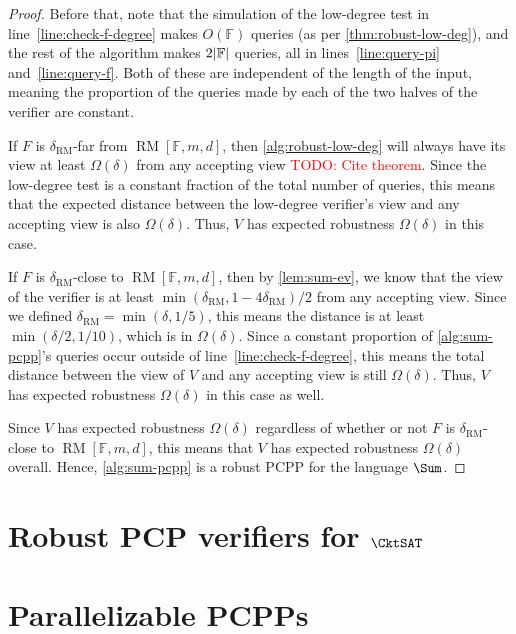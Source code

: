 \documentclass[english,12pt]{reedthesis}
\theoremstyle{plain}
\theoremstyle{definition}
\theoremstyle{remark}
\DeclareMathOperator{\RM}{RM}
\DeclarePairedDelimiter{\abs}{\lvert}{\rvert}
\newcommand{\TODO}[1]{\textcolor{red}{TODO: #1}}
\begin{document}
\begin{proof}
  Before that, note that the simulation of the low-degree test in
  line~\ref{line:check-f-degree} makes $O(\mathbb{F})$ queries (as per
  \cref{thm:robust-low-deg}), and the rest of the algorithm makes
  $2\abs{\mathbb{F}}$ queries, all in lines~\ref{line:query-pi}
  and~\ref{line:query-f}. Both of these are independent of the length of the
  input, meaning the proportion of the queries made by each of the two halves of
  the verifier are constant.

  If $F$ is $\delta_{\RM}$-far from $\RM[\mathbb{F}, m, d]$, then
  \cref{alg:robust-low-deg} will always have its view at least $\Omega(\delta)$ from any
  accepting view \TODO{Cite theorem}. Since the low-degree test is a constant
  fraction of the total number of queries, this means that the expected distance
  between the low-degree verifier's view and any accepting view is also $\Omega(\delta)$.
  Thus, $V$ has expected robustness $\Omega(\delta)$ in this case.

  If $F$ is $\delta_{\RM}$-close to $\RM[\mathbb{F}, m, d]$, then by
  \cref{lem:sum-ev}, we know that the view of the verifier is at least
  $\min(\delta_{\RM}, 1 - 4\delta_{\RM})/2$ from any accepting view. Since we defined
  $\delta_{\RM} = \min(\delta, 1/5)$, this means the distance is at least
  $\min(\delta/2, 1/10)$, which is in $\Omega(\delta)$. Since a constant proportion of
  \cref{alg:sum-pcpp}'s queries occur outside of line~\ref{line:check-f-degree},
  this means the total distance between the view of $V$ and any accepting view
  is still $\Omega(\delta)$. Thus, $V$ has expected robustness $\Omega(\delta)$ in this case as well.

  Since $V$ has expected robustness $\Omega(\delta)$ regardless of whether or not $F$ is
  $\delta_{\RM}$-close to $\RM[\mathbb{F}, m, d]$, this means that $V$ has expected
  robustness $\Omega(\delta)$ overall. Hence, \cref{alg:sum-pcpp} is a robust PCPP for
  the language $\Sum$.
\end{proof}

\section{Robust PCP verifiers for $\CktSAT$}\label{sec:robust-pcp-cktsat}


\section{Parallelizable PCPPs}\label{sec:parallel-pcp}
\end{document}
